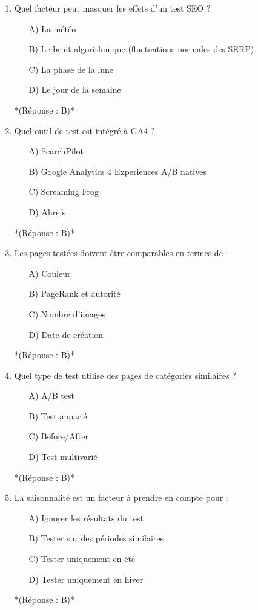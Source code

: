 \documentclass[12pt,a4paper,twoside]{report}
\begin{document}
\begin{enumerate}
    \item Quel facteur peut masquer les effets d'un test SEO ?
    \begin{itemize}
        \item[A)] La météo
        \item[B)] Le bruit algorithmique (fluctuations normales des SERP)
        \item[C)] La phase de la lune
        \item[D)] Le jour de la semaine
    \end{itemize}
    *(Réponse : B)*

    \item Quel outil de test est intégré à GA4 ?
    \begin{itemize}
        \item[A)] SearchPilot
        \item[B)] Google Analytics 4 Experiences A/B natives
        \item[C)] Screaming Frog
        \item[D)] Ahrefs
    \end{itemize}
    *(Réponse : B)*

    \item Les pages testées doivent être comparables en termes de :
    \begin{itemize}
        \item[A)] Couleur
        \item[B)] PageRank et autorité
        \item[C)] Nombre d'images
        \item[D)] Date de création
    \end{itemize}
    *(Réponse : B)*

    \item Quel type de test utilise des pages de catégories similaires ?
    \begin{itemize}
        \item[A)] A/B test
        \item[B)] Test apparié
        \item[C)] Before/After
        \item[D)] Test multivarié
    \end{itemize}
    *(Réponse : B)*

    \item La saisonnalité est un facteur à prendre en compte pour :
    \begin{itemize}
        \item[A)] Ignorer les résultats du test
        \item[B)] Tester sur des périodes similaires
        \item[C)] Tester uniquement en été
        \item[D)] Tester uniquement en hiver
    \end{itemize}
    *(Réponse : B)*


\end{enumerate}
\end{document}
